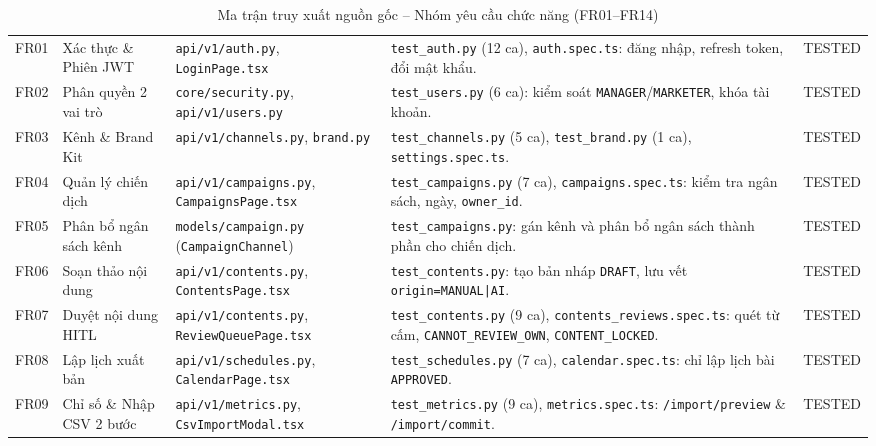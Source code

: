 \begin{table}[!htbp]
\centering
\scriptsize
\renewcommand{\arraystretch}{0.96}
\caption{Ma trận truy xuất nguồn gốc -- Nhóm yêu cầu chức năng (FR01--FR14)}\label{tab:traceability-fr}
\begin{tabularx}{\textwidth}{|C{0.9cm}|L{2.5cm}|L{3.5cm}|Y|C{1.9cm}|}
\hline
{} &  &  &  & \\
\hline
FR01 & Xác thực \& Phiên JWT & \texttt{api/v1/auth.py}, \texttt{LoginPage.tsx} & \texttt{test\_auth.py} (12 ca), \texttt{auth.spec.ts}: đăng nhập, refresh token, đổi mật khẩu. & TESTED\\
\hline
FR02 & Phân quyền 2 vai trò & \texttt{core/security.py}, \texttt{api/v1/users.py} & \texttt{test\_users.py} (6 ca): kiểm soát \texttt{MANAGER}/\texttt{MARKETER}, khóa tài khoản. & TESTED\\
\hline
FR03 & Kênh \& Brand Kit & \texttt{api/v1/channels.py}, \texttt{brand.py} & \texttt{test\_channels.py} (5 ca), \texttt{test\_brand.py} (1 ca), \texttt{settings.spec.ts}. & TESTED\\
\hline
FR04 & Quản lý chiến dịch & \texttt{api/v1/campaigns.py}, \texttt{CampaignsPage.tsx} & \texttt{test\_campaigns.py} (7 ca), \texttt{campaigns.spec.ts}: kiểm tra ngân sách, ngày, \texttt{owner\_id}. & TESTED\\
\hline
FR05 & Phân bổ ngân sách kênh & \texttt{models/campaign.py} (\texttt{CampaignChannel}) & \texttt{test\_campaigns.py}: gán kênh và phân bổ ngân sách thành phần cho chiến dịch. & TESTED\\
\hline
FR06 & Soạn thảo nội dung & \texttt{api/v1/contents.py}, \texttt{ContentsPage.tsx} & \texttt{test\_contents.py}: tạo bản nháp \texttt{DRAFT}, lưu vết \texttt{origin=MANUAL|AI}. & TESTED\\
\hline
FR07 & Duyệt nội dung HITL & \texttt{api/v1/contents.py}, \texttt{ReviewQueuePage.tsx} & \texttt{test\_contents.py} (9 ca), \texttt{contents\_reviews.spec.ts}: quét từ cấm, \texttt{CANNOT\_REVIEW\_OWN}, \texttt{CONTENT\_LOCKED}. & TESTED\\
\hline
FR08 & Lập lịch xuất bản & \texttt{api/v1/schedules.py}, \texttt{CalendarPage.tsx} & \texttt{test\_schedules.py} (7 ca), \texttt{calendar.spec.ts}: chỉ lập lịch bài \texttt{APPROVED}. & TESTED\\
\hline
FR09 & Chỉ số \& Nhập CSV 2 bước & \texttt{api/v1/metrics.py}, \texttt{CsvImportModal.tsx} & \texttt{test\_metrics.py} (9 ca), \texttt{metrics.spec.ts}: \texttt{/import/preview} \& \texttt{/import/commit}. & TESTED\\

\end{tabularx}
\end{table}
